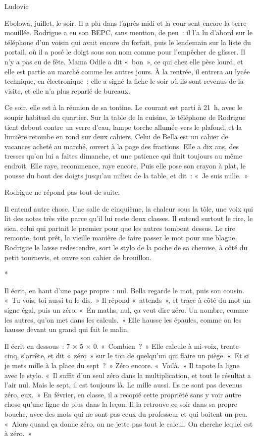 \documentclass[10.5pt,twoside,openright]{book}
\newcommand{\asterisme}{\par\vspace{0.7em}\centerline{\color{gris}*\quad*\quad*}\vspace{0.7em}\par\noindent}
\newcommand{\chapitresn}[1]{\cleardoublepage\markright{#1}\thispagestyle{plain}\vspace*{2.8cm}{\noindent\LARGE\bfseries #1\par}\vspace{1.6em}\noindent\ignorespaces}
\begin{document}
Ludovic


\chapitresn{Épilogue — Le mot, encore}

Ebolowa, juillet, le soir. Il a plu dans l’après-midi et la cour sent encore la terre mouillée. Rodrigue a eu son BEPC, sans mention, de peu : il l’a lu d’abord sur le téléphone d’un voisin qui avait encore du forfait, puis le lendemain sur la liste du portail, où il a posé le doigt sous son nom comme pour l’empêcher de glisser. Il n’y a pas eu de fête. Mama Odile a dit « bon », ce qui chez elle pèse lourd, et elle est partie au marché comme les autres jours. À la rentrée, il entrera au lycée technique, en électronique ; elle a signé la fiche le soir où ils sont revenus de la visite, et elle n’a plus reparlé de bureaux.

Ce soir, elle est à la réunion de sa tontine. Le courant est parti à 21 h, avec le soupir habituel du quartier. Sur la table de la cuisine, le téléphone de Rodrigue tient debout contre un verre d’eau, lampe torche allumée vers le plafond, et la lumière retombe en rond sur deux cahiers. Celui de Bella est un cahier de vacances acheté au marché, ouvert à la page des fractions. Elle a dix ans, des tresses qu’on lui a faites dimanche, et une patience qui finit toujours au même endroit. Elle raye, recommence, raye encore. Puis elle pose son crayon à plat, le pousse du bout des doigts jusqu’au milieu de la table, et dit : « Je suis nulle. »

Rodrigue ne répond pas tout de suite.

Il entend autre chose. Une salle de cinquième, la chaleur sous la tôle, une voix qui lit des notes très vite parce qu’il lui reste deux classes. Il entend surtout le rire, le sien, celui qui partait le premier pour que les autres tombent dessus. Le rire remonte, tout prêt, la vieille manière de faire passer le mot pour une blague. Rodrigue le laisse redescendre, sort le stylo de la poche de sa chemise, à côté du petit tournevis, et ouvre son cahier de brouillon.

\asterisme

Il écrit, en haut d’une page propre : nul. Bella regarde le mot, puis son cousin. « Tu vois, toi aussi tu le dis. » Il répond « attends », et trace à côté du mot un signe égal, puis un zéro. « En maths, nul, ça veut dire zéro. Un nombre, comme les autres, qu’on met dans les calculs. » Elle hausse les épaules, comme on les hausse devant un grand qui fait le malin.

Il écrit en dessous : 7 × 5 × 0. « Combien ? » Elle calcule à mi-voix, trente-cinq, s’arrête, et dit « zéro » sur le ton de quelqu’un qui flaire un piège. « Et si je mets mille à la place du sept ? » Zéro encore. « Voilà. » Il tapote la ligne avec le stylo. « Il suffit d’un seul zéro dans la multiplication, et tout le résultat a l’air nul. Mais le sept, il est toujours là. Le mille aussi. Ils ne sont pas devenus zéro, eux. » En février, en classe, il a recopié cette propriété sans y voir autre chose qu’une ligne de plus dans la leçon. Il la retrouve ce soir dans sa propre bouche, avec des mots qui ne sont pas ceux du professeur et qui boitent un peu. « Alors quand ça donne zéro, on ne jette pas tout le calcul. On cherche lequel est à zéro. »
\end{document}
